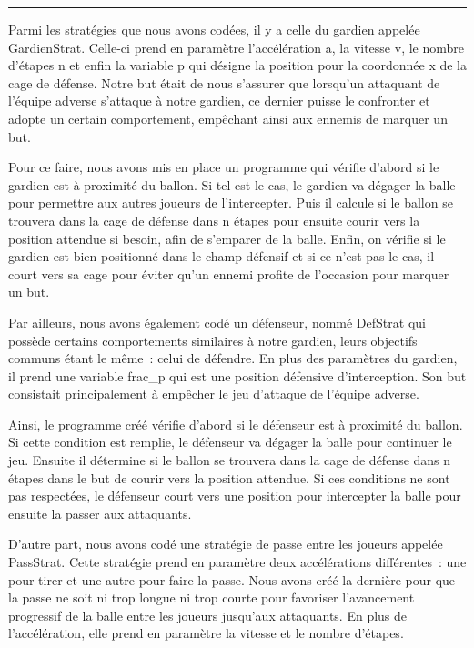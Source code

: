 \documentclass[a4paper,12pt]{article}
\numberwithin{equation}{section}
\begin{document}
\noindent \textcolor{red}{\rule{\textwidth}{0.5cm}}

Parmi les stratégies que nous avons codées, il y a celle du gardien appelée GardienStrat. Celle-ci prend en paramètre l’accélération a, la vitesse v, le nombre d’étapes n et enfin la variable p qui désigne la position pour la coordonnée x de la cage de défense. Notre but était de nous s’assurer que lorsqu’un attaquant de l’équipe adverse s’attaque à notre gardien, ce dernier puisse le confronter et adopte un certain comportement, empêchant ainsi aux ennemis de marquer un but. 

Pour ce faire, nous avons mis en place un programme qui vérifie d’abord si le gardien est à proximité du ballon. Si tel est le cas, le gardien va dégager la balle pour permettre aux autres joueurs de l’intercepter. Puis il calcule si le ballon se trouvera dans la cage de défense dans n étapes pour ensuite courir vers la position attendue si besoin, afin de s’emparer de la balle. Enfin, on vérifie si le gardien est bien positionné dans le champ défensif et si ce n’est pas le cas, il court vers sa cage pour éviter qu’un ennemi profite de l’occasion pour marquer un but.

Par ailleurs, nous avons également codé un défenseur, nommé DefStrat qui possède certains comportements similaires à notre gardien, leurs objectifs communs étant le même : celui de défendre. En plus des paramètres du gardien, il prend une variable frac\_p qui est une position défensive d’interception. Son but consistait principalement à empêcher le jeu d'attaque de l'équipe adverse.

Ainsi, le programme créé vérifie d’abord si le défenseur est à proximité du ballon. Si cette condition est remplie, le défenseur va dégager la balle pour continuer le jeu. Ensuite il détermine si le ballon se trouvera dans la cage de défense dans n étapes dans le but de courir vers la position attendue. Si ces conditions ne sont pas respectées, le défenseur court vers une position pour intercepter la balle pour ensuite la passer aux attaquants.

D’autre part, nous avons codé une stratégie de passe entre les joueurs appelée PassStrat.
Cette stratégie prend en paramètre deux accélérations différentes : une pour tirer et une autre pour faire la passe. Nous avons créé la dernière pour que la passe ne soit ni trop longue ni trop courte pour favoriser l’avancement progressif de la balle entre les joueurs jusqu’aux attaquants. En plus de l’accélération, elle prend en paramètre la vitesse et le nombre d’étapes.
\end{document}
